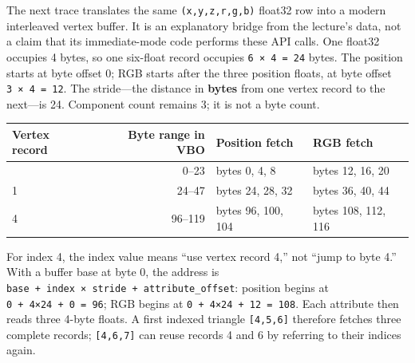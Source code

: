 \hypertarget{03-visual-computing-i-ch018-modern-buffer-bridge-bytes-stride-offset-and-binding}{}

The next trace translates the same \texttt{(x,y,z,r,g,b)} float32 row into a modern interleaved vertex buffer. It is an explanatory bridge from the lecture's data, not a claim that its immediate-mode code performs these API calls. One float32 occupies 4 bytes, so one six-float record occupies \texttt{6\ ×\ 4\ =\ 24} bytes. The position starts at byte offset 0; RGB starts after the three position floats, at byte offset \texttt{3\ ×\ 4\ =\ 12}. The stride---the distance in \textbf{bytes} from one vertex record to the next---is 24. Component count remains 3; it is not a byte count.

{\def\LTcaptype{none} %
\begin{longtable}[]{@{}lrll@{}}
\toprule\noalign{}
Vertex record & Byte range in VBO & Position fetch & RGB fetch \\
\midrule\noalign{}
\endhead
\bottomrule\noalign{}
\endlastfoot
0 & 0--23 & bytes 0, 4, 8 & bytes 12, 16, 20 \\
1 & 24--47 & bytes 24, 28, 32 & bytes 36, 40, 44 \\
4 & 96--119 & bytes 96, 100, 104 & bytes 108, 112, 116 \\
\end{longtable}
}

For index 4, the index value means ``use vertex record 4,'' not ``jump to byte 4.'' With a buffer base at byte 0, the address is \texttt{base\ +\ index\ ×\ stride\ +\ attribute\_offset}: position begins at \texttt{0\ +\ 4×24\ +\ 0\ =\ 96}; RGB begins at \texttt{0\ +\ 4×24\ +\ 12\ =\ 108}. Each attribute then reads three 4-byte floats. A first indexed triangle \texttt{{[}4,5,6{]}} therefore fetches three complete records; \texttt{{[}4,6,7{]}} can reuse records 4 and 6 by referring to their indices again.


